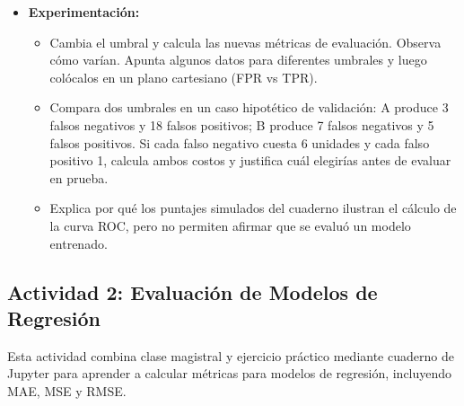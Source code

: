 \documentclass[a4,11pt]{aleph-notas}
\begin{document}
\begin{itemize}[leftmargin=*]
    \item \textbf{Experimentación:} 
    \begin{itemize}
        \item Cambia el umbral y calcula las nuevas métricas de evaluación. Observa cómo varían. Apunta algunos datos para diferentes umbrales y luego colócalos en un plano cartesiano (FPR vs TPR).
        \item Compara dos umbrales en un caso hipotético de validación: A produce 3 falsos negativos y 18 falsos positivos; B produce 7 falsos negativos y 5 falsos positivos. Si cada falso negativo cuesta 6 unidades y cada falso positivo 1, calcula ambos costos y justifica cuál elegirías antes de evaluar en prueba.
        \item Explica por qué los puntajes simulados del cuaderno ilustran el cálculo de la curva ROC, pero no permiten afirmar que se evaluó un modelo entrenado.
    \end{itemize}
    
\end{itemize}

\subsection*{Actividad 2: Evaluación de Modelos de Regresión}

Esta actividad combina clase magistral y ejercicio práctico mediante cuaderno de Jupyter para aprender a calcular métricas para modelos de regresión, incluyendo MAE, MSE y RMSE.
\end{document}
